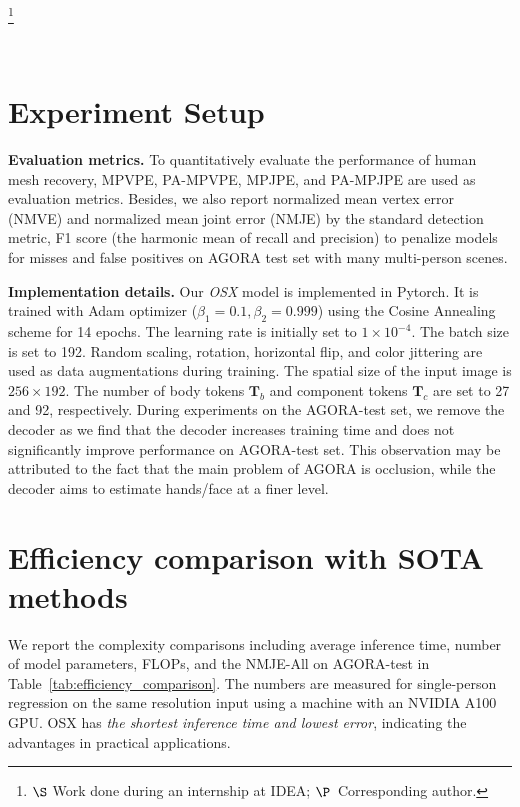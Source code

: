 \documentclass[10pt,twocolumn,letterpaper]{article}
\newcommand{\modelname}{\emph{OSX}\xspace}
\newcommand\blfootnote[1]{\begingroup
  \renewcommand\thefootnote{}\footnote{#1}\addtocounter{footnote}{-1}\endgroup
}
\begin{document}
\blfootnote{$\S$ Work done during an internship at IDEA; ${\P}$~Corresponding author.}\

\section{Experiment Setup}
\label{sec:exp_setup}

\noindent\textbf{Evaluation metrics.} To quantitatively evaluate the performance of human mesh recovery, MPVPE, PA-MPVPE, MPJPE, and PA-MPJPE are used as evaluation metrics. Besides, we also report normalized mean vertex error (NMVE) and normalized mean joint error (NMJE) by the standard detection metric, F1 score (the harmonic mean of recall and precision) to penalize models for misses and false positives on AGORA test set with many multi-person scenes.

\noindent\textbf{Implementation details.} Our \modelname model is implemented in Pytorch. It is trained with Adam optimizer ($\beta_1=0.1, \beta_2=0.999$) using the Cosine Annealing scheme for 14 epochs. The learning rate is initially set to $1\times10^{-4}$. The batch size is set to 192. Random scaling, rotation, horizontal flip, and color jittering are used as data augmentations during training. The spatial size of the input image is $256\times 192$. The number of body tokens $\mathbf{T}_b$ and component tokens $\mathbf{T}_c$ are set to 27 and 92, respectively. During experiments on the AGORA-test set, we remove the decoder as we find that the decoder increases training time and does not significantly improve performance on AGORA-test set. This observation may be attributed to the fact that the main problem of AGORA is occlusion, while the decoder aims to estimate hands/face at a finer level.

\section{Efficiency comparison with SOTA methods}
\label{sec:efficiency_comp}
\noindent We report the complexity comparisons including average inference time, number of model parameters, FLOPs, and the NMJE-All on AGORA-test in Table~\ref{tab:efficiency_comparison}. The numbers are measured for single-person regression on the same resolution input using a machine with an NVIDIA A100 GPU. OSX has \emph{the shortest inference time and lowest error}, indicating the advantages in practical applications.
        
\end{document}
